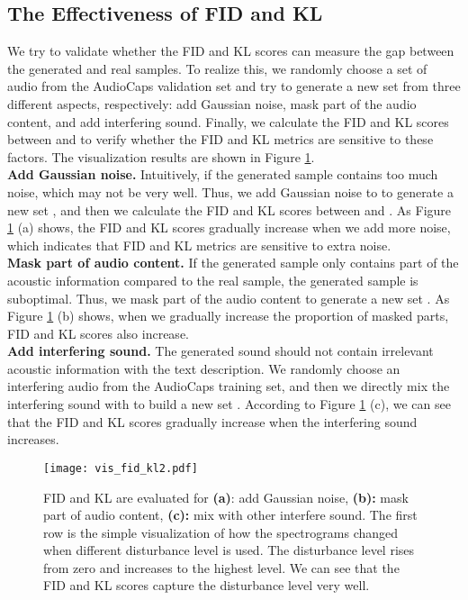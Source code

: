 \documentclass[lettersize,journal]{IEEEtran}
\begin{document}
\subsection{The Effectiveness of FID and KL}
We try to validate whether the FID and KL scores can measure the gap between the generated and real samples. To realize this, we randomly choose {\color{black}a set of} audio  from the AudioCaps \cite{kim2019audiocaps} validation set and try to generate a new set  from three different aspects, respectively: add Gaussian noise, mask part of the audio content, and add interfering sound. Finally, we calculate the FID and KL scores between  and  to verify whether the FID and KL metrics are sensitive to these factors. The visualization results are shown in Figure \ref{fig:2}. \\
\textbf{Add Gaussian noise.} Intuitively, if the generated sample contains too much noise, which may not be very well. Thus, we add Gaussian noise to  to generate a new set , and then we calculate the FID and KL scores between  and . As Figure \ref{fig:2} (a) shows, the FID and KL scores gradually increase when we add more noise, which indicates that FID and KL metrics are sensitive to extra noise. \\
\textbf{Mask part of audio content.} If the generated sample only contains part of the acoustic information compared to the real sample, the generated sample is suboptimal. Thus, we mask part of the audio content to generate a new set . As Figure \ref{fig:2} (b) shows, when we gradually increase the proportion of masked parts, FID and KL scores also increase. \\
\textbf{Add interfering sound.} The generated sound should not contain irrelevant acoustic information with the text description. We randomly choose an interfering audio from the AudioCaps training set, and then we directly mix the interfering sound with  to build a new set . According to Figure \ref{fig:2} (c), we can see that the FID and KL scores gradually increase when the interfering sound increases. \\
\begin{figure}[t] \label{fig:2}
  \centering
  \texttt{[image: vis\_fid\_kl2.pdf]}
  \caption{FID and KL are evaluated for \textbf{(a)}: add Gaussian noise, \textbf{(b):} mask part of audio content, \textbf{(c):} mix with other interfere sound. The first row is the simple visualization of how the spectrograms changed when different disturbance level is used. The disturbance level rises from zero and increases to the highest level. We can see that {\color{black}the} FID and KL scores capture the disturbance level very well.}
  \label{fig:2}
  \vspace*{-\baselineskip}
\end{figure}
\end{document}
